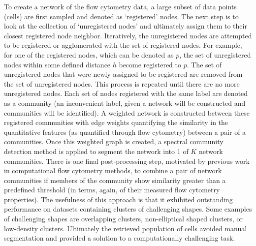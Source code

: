 \indent To create a network of the flow cytometry data, a large subset of data points (cells) are first sampled and denoted as `registered' nodes. The next step is to look at the collection of `unregistered nodes' and ultimately assign them to their closest registered node neighbor. Iteratively, the unregistered nodes are attempted to be registered or agglomerated with the set of registered nodes. For example, for one of the registered nodes, which can be denoted as $p$, the set of unregistered nodes within some defined distance $h$ become registered to $p$.  The set of unregistered nodes that were newly assigned to be registered are removed from the set of unregistered nodes. This process is repeated until there are no more unregistered nodes. Each set of nodes registered with the same label are denoted as a community (an inconvenient label, given a network will be constructed and communities will be identified). A weighted network is constructed between these registered communities with edge weights quantifying the similarity in the quantitative features (as quantified through flow cytometry) between a pair of a communities. Once this weighted graph is created, a spectral community detection method \cite{spectral1} is applied to segment the network into 1 of $K$ network communities. There is one final post-processing step, motivated by previous work in computational flow cytometry methods,  to combine a pair of network communities if members of the community show similarity greater than a predefined threshold (in terms, again, of their measured flow cytometry properties). The usefulness of this approach is that it exhibited outstanding performance on datasets containing clusters of challenging shapes. Some examples of challenging shapes are overlapping clusters, non-elliptical shaped clusters, or low-density clusters. Ultimately the retrieved population of cells avoided manual segmentation and provided a solution to a computationally challenging task.

